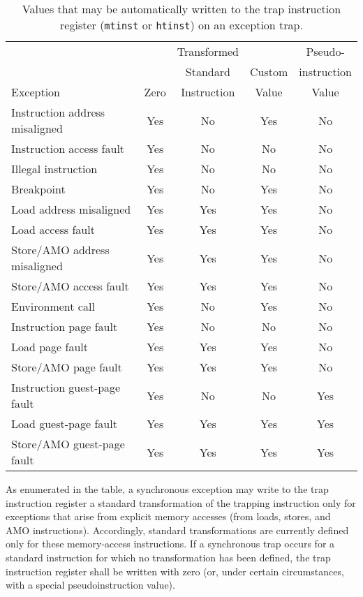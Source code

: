 \begin{table*}[h!]
\begin{center}
\begin{tabular}{|l|c|c|c|c|}
\hline
                               &      & Transformed &        & Pseudo- \\
                               &      & Standard    & Custom & instruction \\
Exception                      & Zero & Instruction & Value  & Value \\
\hline
Instruction address misaligned & Yes  & No          & Yes    & No  \\
\hline
Instruction access fault       & Yes  & No          & No     & No  \\
Illegal instruction            & Yes  & No          & No     & No  \\
Breakpoint                     & Yes  & No          & Yes    & No  \\
\hline
Load address misaligned        & Yes  & Yes         & Yes    & No  \\
Load access fault              & Yes  & Yes         & Yes    & No  \\
Store/AMO address misaligned   & Yes  & Yes         & Yes    & No  \\
Store/AMO access fault         & Yes  & Yes         & Yes    & No  \\
\hline
Environment call               & Yes  & No          & Yes    & No  \\
\hline
Instruction page fault         & Yes  & No          & No     & No  \\
Load page fault                & Yes  & Yes         & Yes    & No  \\
Store/AMO page fault           & Yes  & Yes         & Yes    & No  \\
\hline
Instruction guest-page fault   & Yes  & No          & No     & Yes \\
Load guest-page fault          & Yes  & Yes         & Yes    & Yes \\
Store/AMO guest-page fault     & Yes  & Yes         & Yes    & Yes \\
\hline
\end{tabular}
\end{center}
\caption{Values that may be automatically written to the trap instruction
register ({\tt mtinst} or {\tt htinst}) on an exception trap.}
\label{tab:tinst-values}
\end{table*}

As enumerated in the table, a synchronous exception may write to the trap
instruction register a standard transformation of the trapping
instruction only for exceptions that arise from explicit memory accesses
(from loads, stores, and AMO instructions).
Accordingly, standard transformations are currently defined only for
these memory-access instructions.
If a synchronous trap occurs for a standard instruction for which no
transformation has been defined, the trap instruction register shall be
written with zero (or, under certain circumstances, with a special
pseudoinstruction value).

